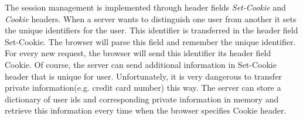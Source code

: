 The session management is implemented through header fields  \textit{Set-Cookie} and \textit{Cookie} headers. When a server wants to distinguish one user from another it sets the unique identifiers for the user. This identifier is transferred in the header field Set-Cookie. The browser will parse this field and remember the unique identifier. For every new request, the browser will send this identifier its header field Cookie. Of course, the server can send additional information in Set-Cookie header that is unique for user. Unfortunately, it is very dangerous to transfer private information(e.g. credit card number) this way. The server can store a dictionary of user ids and corresponding private information in memory and retrieve this information every time when the browser specifies Cookie header. 


\newpage


